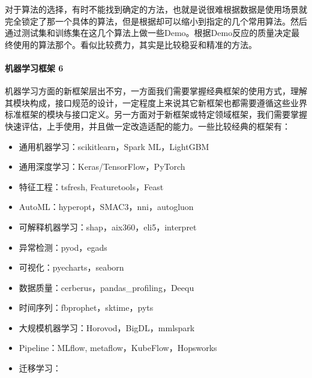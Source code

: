 \documentclass[letterpaper,10pt,english]{sphinxmanual}
\begin{document}
对于算法的选择，有时不能找到确定的方法，也就是说很难根据数据是使用场景就完全锁定了那一个具体的算法，但是根据却可以缩小到指定的几个常用算法。然后通过测试集和训练集在这几个算法上做一些Demo。根据Demo反应的质量决定最终使用的算法那个。看似比较费力，其实是比较稳妥和精准的方法。


\paragraph{机器学习框架 6\sphinxfootnotemark[927]}
\label{\detokenize{chapter_AI_dive/ML:id9}}%
\begin{footnotetext}[927]\sphinxAtStartFootnote
{}
%
\end{footnotetext}\ignorespaces 
机器学习方面的新框架层出不穷，一方面我们需要掌握经典框架的使用方式，理解其模块构成，接口规范的设计，一定程度上来说其它新框架也都需要遵循这些业界标准框架的模块与接口定义。另一方面对于新框架或特定领域框架，我们需要掌握快速评估，上手使用，并且做一定改造适配的能力。一些比较经典的框架有：
\begin{itemize}
\item {} 
通用机器学习：scikit\sphinxhyphen{}learn，Spark ML，LightGBM

\item {} 
通用深度学习：Keras/TensorFlow，PyTorch

\item {} 
特征工程：tsfresh, Featuretools，Feast

\item {} 
AutoML：hyperopt，SMAC3，nni，autogluon

\item {} 
可解释机器学习：shap，aix360，eli5，interpret

\item {} 
异常检测：pyod，egads

\item {} 
可视化：pyecharts，seaborn

\item {} 
数据质量：cerberus，pandas\_profiling，Deequ

\item {} 
时间序列：fbprophet，sktime，pyts

\item {} 
大规模机器学习：Horovod，BigDL，mmlspark

\item {} 
Pipeline：MLflow, metaflow，KubeFlow，Hopsworks

\item {} 
迁移学习：

\end{itemize}
\end{document}
